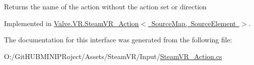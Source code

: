 Returns the name of the action without the action set or direction 



Implemented in \mbox{\hyperlink{class_valve_1_1_v_r_1_1_steam_v_r___action_a94911ac96600a93ce23790166435b593}{Valve.\+V\+R.\+Steam\+V\+R\+\_\+\+Action$<$ Source\+Map, Source\+Element $>$}}.



The documentation for this interface was generated from the following file\+:\begin{DoxyCompactItemize}
\item 
O\+:/\+Git\+H\+U\+B\+M\+I\+N\+I\+P\+Roject/\+Assets/\+Steam\+V\+R/\+Input/\mbox{\hyperlink{_steam_v_r___action_8cs}{Steam\+V\+R\+\_\+\+Action.\+cs}}\end{DoxyCompactItemize}
